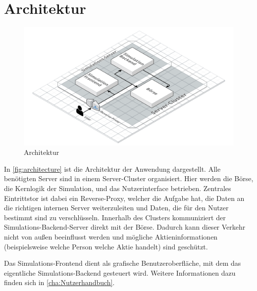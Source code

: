 \section{Architektur}\label{sec:Architektur}
\begin{figure}[ht]
    \includegraphics[width=\textwidth]{img/architecture.png}
    \centering
    \caption{Architektur}
    \label{fig:architecture}
\end{figure}

In \autoref{fig:architecture} ist die Architektur der Anwendung dargestellt.
Alle benötigten Server sind in einem Server-Cluster organisiert.
Hier werden die Börse, die Kernlogik der Simulation, und das Nutzerinterface betrieben. Zentrales Eintrittstor ist dabei ein Reverse-Proxy, welcher die Aufgabe hat, die Daten an die richtigen internen Server weiterzuleiten und Daten, die für den Nutzer bestimmt sind zu verschlüsseln.
Innerhalb des Clusters kommuniziert der Simulations-Backend-Server direkt mit der Börse. Dadurch kann dieser Verkehr nicht von außen beeinflusst werden und mögliche Aktieninformationen (beispielsweise welche Person welche Aktie handelt) sind geschützt.

Das Simulations-Frontend dient als grafische Benutzeroberfläche, mit dem das eigentliche Simulations-Backend gesteuert wird. Weitere Informationen dazu finden sich in \autoref{cha:Nutzerhandbuch}.

